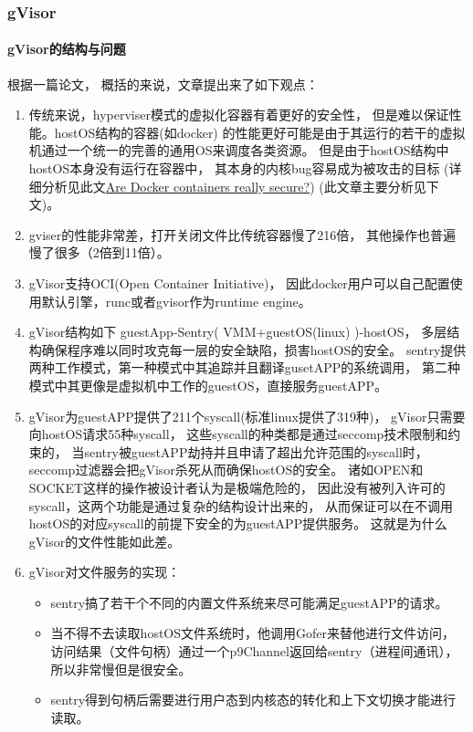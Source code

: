 \documentclass[AutoFakeBold,a4paper]{ctexart}
\begin{document}
\subsubsection{gVisor}

\paragraph{gVisor的结构与问题}

根据一篇论文\cite{234857}，
概括的来说，文章提出来了如下观点：

\begin{enumerate}
    \item 传统来说，hyperviser模式的虚拟化容器有着更好的安全性，
    但是难以保证性能。hostOS结构的容器(如docker)
    的性能更好可能是由于其运行的若干的虚拟机通过一个统一的完善的通用OS来调度各类资源。
    但是由于hostOS结构中hostOS本身没有运行在容器中，
    其本身的内核bug容易成为被攻击的目标 
    (详细分析见此文\href{https://opensource.com/business/14/7/docker-security-selinux}
    {Are Docker containers really secure?}\cite{DanielJDocker}) 
    (此文章主要分析见下文)。
    \item gviser的性能非常差，打开关闭文件比传统容器慢了216倍，
    其他操作也普遍慢了很多（2倍到11倍）。
    \item gVisor支持OCI(Open Container Initiative)，
    因此docker用户可以自己配置使用默认引擎，runc或者gvisor作为runtime engine。
    \item gVisor结构如下 guestApp-Sentry( VMM+guestOS(linux) )-hostOS，
    多层结构确保程序难以同时攻克每一层的安全缺陷，损害hostOS的安全。
    sentry提供两种工作模式，第一种模式中其追踪并且翻译gusetAPP的系统调用，
    第二种模式中其更像是虚拟机中工作的guestOS，直接服务guestAPP。
    \item gVisor为guestAPP提供了211个syscall(标准linux提供了319种)，
    gVisor只需要向hostOS请求55种syscall，
    这些syscall的种类都是通过seccomp技术限制和约束的，
    当sentry被guestAPP劫持并且申请了超出允许范围的syscall时，
    seccomp过滤器会把gVisor杀死从而确保hostOS的安全。
    诸如OPEN和SOCKET这样的操作被设计者认为是极端危险的，
    因此没有被列入许可的syscall，这两个功能是通过复杂的结构设计出来的，
    从而保证可以在不调用hostOS的对应syscall的前提下安全的为guestAPP提供服务。
    这就是为什么gVisor的文件性能如此差。
    \item gVisor对文件服务的实现：
    \begin{itemize}
        \item sentry搞了若干个不同的内置文件系统来尽可能满足guestAPP的请求。
        \item 当不得不去读取hostOS文件系统时，他调用Gofer来替他进行文件访问，
        访问结果（文件句柄）通过一个p9Channel返回给sentry（进程间通讯），
        所以非常慢但是很安全。
        \item sentry得到句柄后需要进行用户态到内核态的转化和上下文切换才能进行读取。
    \end{itemize}
    

\end{enumerate}
\end{document}
